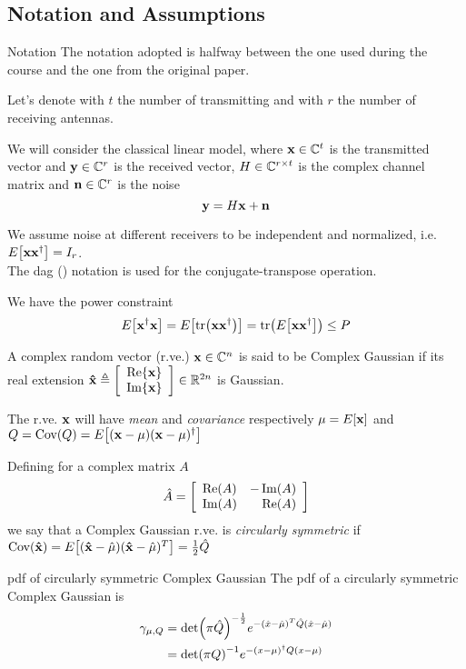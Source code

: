 \subsection{Notation and Assumptions}
\begin{frame}[allowframebreaks]{Notation}
The notation adopted is halfway between the one used during the course and the one from the original paper.

\myspace
Let's denote with $t$ the number of transmitting and with $r$ the number of receiving antennas.

\myspace
We will consider the classical linear model, where $\vb{x}\in \mathbb{C}^{t}$ is the transmitted vector and $\vb{y}\in \mathbb{C}^{r}$ is the received vector, $H\in \mathbb{C}^{r\times t}$ is the complex channel matrix and $\vb{n}\in \mathbb{C}^{r}$ is the noise
$$\vb{y} = H\vb{x} + \vb{n}$$

\framebreak

We assume noise at different receivers to be independent and normalized, i.e. $E\qty[\vb{x} \vb{x}^\dagger] = I_r$.\\
The dag (\dag) notation is used for the conjugate-transpose operation.

\myspace
We have the power constraint
$$E\qty[\vb{x}^\dagger\vb{x}] = E\qty[\tr(\vb{x}\vb{x}^\dagger)] = \tr(E\qty[\vb{x}\vb{x}^\dagger])\leq P$$

\myspace
A complex random vector (r.ve.) $\vb{x}\in \mathbb{C}^{n}$ is said to be Complex Gaussian if its real extension $\vu{x} \triangleq \qty[\begin{array}{c}
\Re{\vb{x}}\\
\Im{\vb{x}}
\end{array}]
\in \mathbb{R}^{2n}$ is Gaussian.

\myspace
The r.ve. $\vb{x}$ will have \textit{mean} and \textit{covariance} respectively $\mu= E\qty[\vb{x}]$ and $Q = \text{Cov}\qty(Q) = E\qty[(\vb{x}-\mu)(\vb{x}-\mu)^\dagger]$

\framebreak

Defining for a complex matrix $A$
$$\hat{A} = \qty[\begin{array}{lr}
\Re(A) & -\Im(A)\\
\Im(A) & \Re(A)
\end{array}]$$
we say that a Complex Gaussian r.ve. is \textit{circularly symmetric} if $\text{Cov}\qty(\vu{x}) = E\qty[(\vu{x}-\hat{\mu})(\vu{x}-\hat{\mu})^T] = \frac{1}{2} \hat{Q}$

\begin{block}{pdf of circularly symmetric Complex Gaussian}
	The pdf of a circularly symmetric Complex Gaussian is
	\begin{align*}
	\begin{split}
	\gamma_{\mu,Q} &= \det(\pi\hat{Q})^{-\frac{1}{2}} e^{-(\hat{x}-\hat{\mu})^T\hat{Q}(\hat{x}-\hat{\mu})}\\
	&= \det(\pi Q)^{-1} e^{-(x-\mu)^\dagger Q(x-\mu)}
	\end{split}
	\end{align*}
\end{block}

\end{frame}

